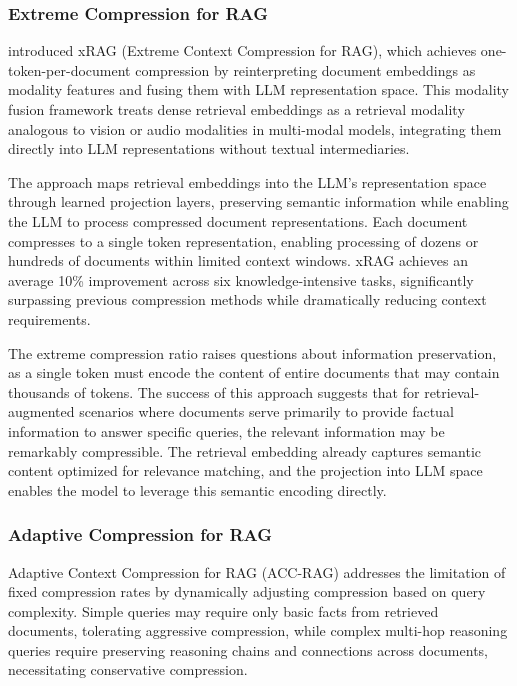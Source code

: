 \subsubsection{Extreme Compression for RAG}

\citet{xrag2024} introduced xRAG (Extreme Context Compression for RAG), which achieves one-token-per-document compression by reinterpreting document embeddings as modality features and fusing them with LLM representation space. This modality fusion framework treats dense retrieval embeddings as a retrieval modality analogous to vision or audio modalities in multi-modal models, integrating them directly into LLM representations without textual intermediaries.

The approach maps retrieval embeddings into the LLM's representation space through learned projection layers, preserving semantic information while enabling the LLM to process compressed document representations. Each document compresses to a single token representation, enabling processing of dozens or hundreds of documents within limited context windows. xRAG achieves an average 10\% improvement across six knowledge-intensive tasks, significantly surpassing previous compression methods while dramatically reducing context requirements.

The extreme compression ratio raises questions about information preservation, as a single token must encode the content of entire documents that may contain thousands of tokens. The success of this approach suggests that for retrieval-augmented scenarios where documents serve primarily to provide factual information to answer specific queries, the relevant information may be remarkably compressible. The retrieval embedding already captures semantic content optimized for relevance matching, and the projection into LLM space enables the model to leverage this semantic encoding directly.

\subsubsection{Adaptive Compression for RAG}

Adaptive Context Compression for RAG (ACC-RAG) addresses the limitation of fixed compression rates by dynamically adjusting compression based on query complexity. Simple queries may require only basic facts from retrieved documents, tolerating aggressive compression, while complex multi-hop reasoning queries require preserving reasoning chains and connections across documents, necessitating conservative compression.

